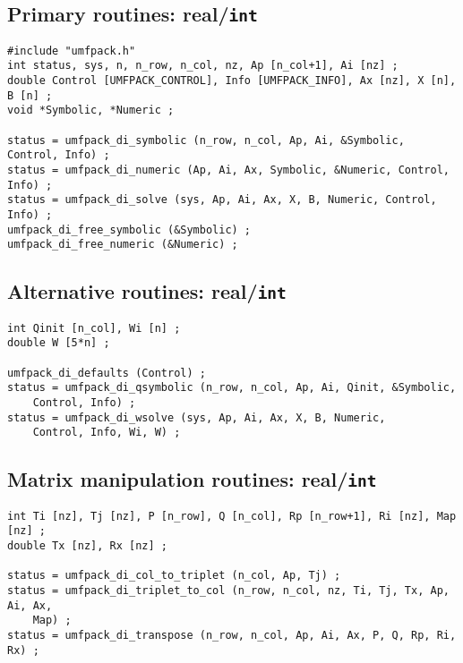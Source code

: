 \subsection{Primary routines: real/{\tt int}}

{\footnotesize
\begin{verbatim}
#include "umfpack.h"
int status, sys, n, n_row, n_col, nz, Ap [n_col+1], Ai [nz] ;
double Control [UMFPACK_CONTROL], Info [UMFPACK_INFO], Ax [nz], X [n], B [n] ;
void *Symbolic, *Numeric ;

status = umfpack_di_symbolic (n_row, n_col, Ap, Ai, &Symbolic, Control, Info) ;
status = umfpack_di_numeric (Ap, Ai, Ax, Symbolic, &Numeric, Control, Info) ;
status = umfpack_di_solve (sys, Ap, Ai, Ax, X, B, Numeric, Control, Info) ;
umfpack_di_free_symbolic (&Symbolic) ;
umfpack_di_free_numeric (&Numeric) ;
\end{verbatim}
}

\subsection{Alternative routines: real/{\tt int}}

{\footnotesize
\begin{verbatim}
int Qinit [n_col], Wi [n] ;
double W [5*n] ;

umfpack_di_defaults (Control) ;
status = umfpack_di_qsymbolic (n_row, n_col, Ap, Ai, Qinit, &Symbolic,
    Control, Info) ;
status = umfpack_di_wsolve (sys, Ap, Ai, Ax, X, B, Numeric,
    Control, Info, Wi, W) ;
\end{verbatim}
}

\subsection{Matrix manipulation routines: real/{\tt int}}

{\footnotesize
\begin{verbatim}
int Ti [nz], Tj [nz], P [n_row], Q [n_col], Rp [n_row+1], Ri [nz], Map [nz] ;
double Tx [nz], Rx [nz] ;

status = umfpack_di_col_to_triplet (n_col, Ap, Tj) ;
status = umfpack_di_triplet_to_col (n_row, n_col, nz, Ti, Tj, Tx, Ap, Ai, Ax,
    Map) ;
status = umfpack_di_transpose (n_row, n_col, Ap, Ai, Ax, P, Q, Rp, Ri, Rx) ;
\end{verbatim}
}

